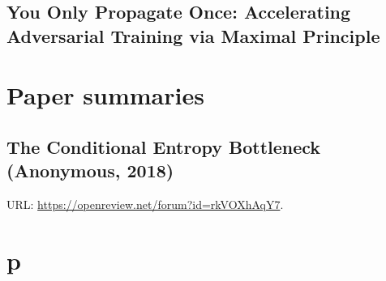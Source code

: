 \documentclass[oneside]{book}
\begin{document}
\subsection{You Only Propagate Once: Accelerating Adversarial
Training via Maximal Principle}




\section{Paper summaries}

\subsection{The Conditional Entropy Bottleneck (Anonymous, 2018)}

URL: \url{https://openreview.net/forum?id=rkVOXhAqY7}.


\section{p}
\end{document}
